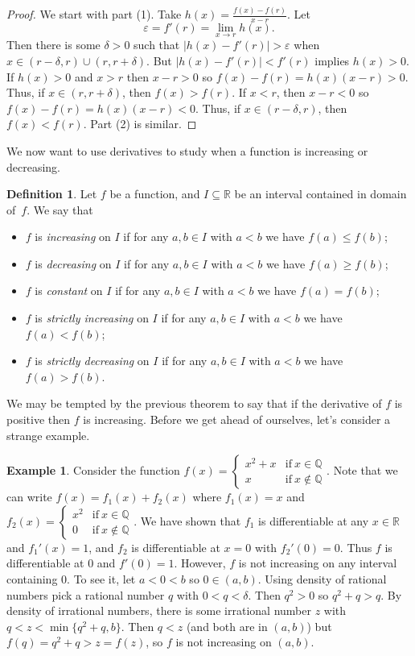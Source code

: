 \documentclass[12pt]{amsart}
\def\d{\delta}
\def\e{\varepsilon}
\newcommand{\Q}{\mathbb{Q}}
\newcommand{\R}{{\mathbb{R}}}
\numberwithin{equation}{section}
\theoremstyle{plain} %
\theoremstyle{definition}
\newtheorem{defn}[equation]{Definition}
\newtheorem{ex}[equation]{Example}
\theoremstyle{remark}
\begin{document}
\begin{proof}
We start with part (1).
Take $h(x) = \frac{ f(x) - f(r) }{x - r}$.  Let \[\e=f'(r) = \lim_{x\to r} h(x).\] Then there is some $\d>0$ such that $|h(x) - f'(r)| > \e$ when $x\in (r-\d,r) \cup (r,r+\d)$. But $|h(x) - f'(r)| < f'(r)$ implies $h(x)>0$. If $h(x)>0$ and $x>r$ then $x-r>0$ so $f(x)-f(r) = h(x) (x-r)>0$. Thus, if $x\in (r,r+\d)$, then $f(x)>f(r)$. If $x<r$, then $x-r<0$ so $f(x)-f(r) = h(x) (x-r)<0$. Thus, if $x\in (r-\d,r)$, then $f(x)<f(r)$. Part (2) is similar.
\end{proof}

We now want to use derivatives to study when a function is increasing or decreasing. 
\begin{defn} Let $f$ be a function, and $I\subseteq \R$ be an interval contained in domain of~$f$. We say that 
\begin{itemize}
\item $f$ is \emph{increasing} on $I$ if for any $a,b\in I$ with $a<b$ we have $f(a) \leq f(b)$;
\item $f$ is \emph{decreasing} on $I$ if for any $a,b\in I$ with $a<b$ we have $f(a) \geq f(b)$;
\item $f$ is \emph{constant} on $I$ if for any $a,b\in I$ with $a<b$ we have $f(a) = f(b)$;
\item  $f$ is \emph{strictly increasing} on $I$ if for any $a,b\in I$ with $a<b$ we have $f(a) < f(b)$;
\item $f$ is \emph{strictly decreasing} on $I$ if for any $a,b\in I$ with $a<b$ we have $f(a) > f(b)$.
\end{itemize}
\end{defn}

We may be tempted by the previous theorem to say that if the derivative of $f$ is positive then $f$ is increasing.
Before we get ahead of ourselves, let's consider a strange example.

\begin{ex}
Consider the function $f(x)= \begin{cases} x^2  + x & \text{if} \ x\in \Q \\ x &\text{if} \ x\notin \Q \end{cases}$.
Note that we can write $f(x) = f_1(x) + f_2(x)$ where $f_1(x) = x$ and $f_2(x) =  \begin{cases} x^2  & \text{if} \ x\in \Q \\ 0 &\text{if} \ x\notin \Q \end{cases}$.
We have shown that $f_1$ is differentiable at any $x\in \R$ and $f_1'(x) = 1$, and $f_2$ is differentiable at $x=0$ with $f_2'(0)=0$. Thus $f$ is differentiable at $0$ and $f'(0)=1$. However, $f$ is not increasing on any interval containing $0$. To see it, let $a<0<b$ so $0\in (a,b)$. Using density of rational numbers pick a rational number $q$ with $0<q<\d$. Then $q^2>0$ so $q^2+q>q$. By density of irrational numbers, there is some irrational number $z$ with $q<z<\min\{q^2+q,b\}$. Then $q<z$ (and both are in $(a,b)$) but $f(q)=q^2+q>z=f(z)$, so $f$ is not increasing on $(a,b)$.
\end{ex}
\end{document}
